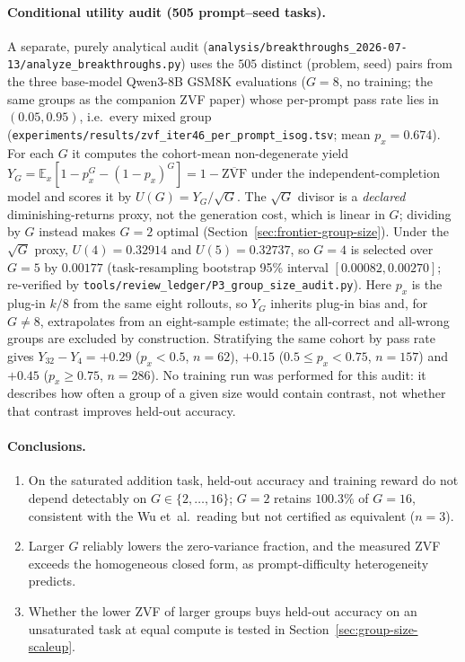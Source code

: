 \paragraph{Conditional utility audit (505 prompt--seed tasks).}
\label{sec:p3-utility-audit}
A separate, purely analytical audit
(\texttt{analysis/breakthroughs\_2026-07-13/analyze\_breakthroughs.py}) uses the
$505$ distinct (problem, seed) pairs from the three base-model Qwen3-8B GSM8K
evaluations ($G{=}8$, no training; the same groups as the companion ZVF paper)
whose per-prompt pass rate lies in $(0.05, 0.95)$, i.e.\ every mixed group
(\texttt{experiments/results/zvf\_iter46\_per\_prompt\_isog.tsv}; mean
$p_x{=}0.674$). For each $G$ it computes the cohort-mean non-degenerate yield
$Y_G=\mathbb{E}_x[1-p_x^G-(1-p_x)^G]=1-\overline{\mathrm{ZVF}}$ under the
independent-completion model and scores it by $U(G)=Y_G/\sqrt{G}$. The $\sqrt{G}$
divisor is a \emph{declared} diminishing-returns proxy, not the generation cost,
which is linear in $G$; dividing by $G$ instead makes $G{=}2$ optimal
(Section~\ref{sec:frontier-group-size}). Under the $\sqrt{G}$ proxy,
$U(4){=}0.32914$ and $U(5){=}0.32737$, so $G{=}4$ is selected over $G{=}5$ by
$0.00177$ (task-resampling bootstrap 95\% interval $[0.00082, 0.00270]$;
re-verified by \texttt{tools/review\_ledger/P3\_group\_size\_audit.py}). Here $p_x$
is the plug-in $k/8$ from the same eight rollouts, so $Y_G$ inherits plug-in bias
and, for $G\neq8$, extrapolates from an eight-sample estimate; the all-correct and
all-wrong groups are excluded by construction.
Stratifying the same cohort by pass rate gives
$Y_{32}-Y_4={+}0.29$ ($p_x<0.5$, $n{=}62$), ${+}0.15$ ($0.5\le p_x<0.75$, $n{=}157$) and
${+}0.45$ ($p_x\ge0.75$, $n{=}286$). No training run was performed for this audit:
it describes how often a group of a given size would contain contrast, not whether
that contrast improves held-out accuracy.

\paragraph{Conclusions.}
\begin{enumerate}
  \item On the saturated addition task, held-out accuracy and training reward do
        not depend detectably on $G\in\{2,\dots,16\}$; $G{=}2$ retains $100.3\%$ of
        $G{=}16$, consistent with the Wu et~al.\ reading but not certified as
        equivalent ($n{=}3$).
  \item Larger $G$ reliably lowers the zero-variance fraction, and the measured
        ZVF exceeds the homogeneous closed form, as prompt-difficulty
        heterogeneity predicts.
  \item Whether the lower ZVF of larger groups buys held-out accuracy on an
        unsaturated task at equal compute is tested in
        Section~\ref{sec:group-size-scaleup}.
\end{enumerate}
